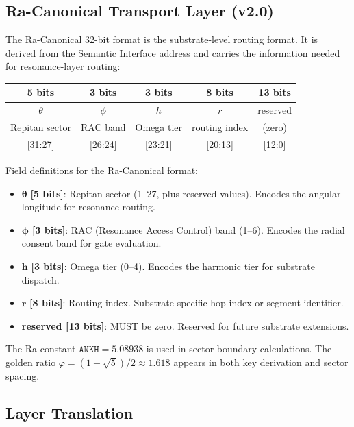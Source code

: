 \documentclass[11pt,a4paper]{article}
\begin{document}
\subsection{Ra-Canonical Transport Layer (v2.0)}

The Ra-Canonical 32-bit format is the substrate-level routing format. It is derived from the Semantic Interface address and carries the information needed for resonance-layer routing:

\begin{center}
\begin{tabular}{|c|c|c|c|c|}
\hline
\textbf{5 bits} & \textbf{3 bits} & \textbf{3 bits} & \textbf{8 bits} & \textbf{13 bits} \\
\hline
$\theta$ & $\phi$ & $h$ & $r$ & reserved \\
Repitan sector & RAC band & Omega tier & routing index & (zero) \\
\hline
{[31:27]} & {[26:24]} & {[23:21]} & {[20:13]} & {[12:0]} \\
\hline
\end{tabular}
\end{center}

\noindent Field definitions for the Ra-Canonical format:

\begin{itemize}
    \item $\boldsymbol{\theta}$ \textbf{[5 bits]}: Repitan sector (1--27, plus reserved values). Encodes the angular longitude for resonance routing.
    \item $\boldsymbol{\phi}$ \textbf{[3 bits]}: RAC (Resonance Access Control) band (1--6). Encodes the radial consent band for gate evaluation.
    \item $\boldsymbol{h}$ \textbf{[3 bits]}: Omega tier (0--4). Encodes the harmonic tier for substrate dispatch.
    \item $\boldsymbol{r}$ \textbf{[8 bits]}: Routing index. Substrate-specific hop index or segment identifier.
    \item \textbf{reserved [13 bits]}: MUST be zero. Reserved for future substrate extensions.
\end{itemize}

\noindent The Ra constant $\mathtt{ANKH} = 5.08938$ is used in sector boundary calculations. The golden ratio $\varphi = (1+\sqrt{5})/2 \approx 1.618$ appears in both key derivation and sector spacing.

\subsection{Layer Translation}
\end{document}
